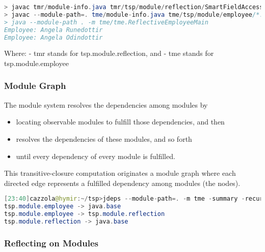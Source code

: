 \begin{lstlisting}[language=Java]
> javac tmr/module-info.java tmr/tsp/module/reflection/SmartFieldAccess.java
> javac --module-path=. tme/module-info.java tme/tsp/module/employee/*.java
> java --module-path . -m tme/tme.ReflectiveEmployeeMain
Employee: Angela Runedottir
Employee: Angela Odindottir
\end{lstlisting}

Where:
- tmr stands for tsp.module.reflection, and
- tme stands for tsp.module.employee

\subsubsection{Module Graph}

The module system resolves the dependencies among modules by

\begin{itemize}
	\item locating observable modules to fulfill those dependencies, and then
	\item resolves the dependencies of these modules, and so forth
	\item until every dependency of every module is fulfilled.
\end{itemize}

This transitive-closure computation originates a module graph where each directed edge represents a fulfilled dependency among modules (the nodes).

\begin{lstlisting}[language=Java]
[23:40]cazzola@hymir:~/tsp>jdeps --module-path=. -m tme -summary -recursive
tsp.module.employee -> java.base
tsp.module.employee -> tsp.module.reflection
tsp.module.reflection -> java.base
\end{lstlisting}

\subsubsection{Reflecting on Modules}

